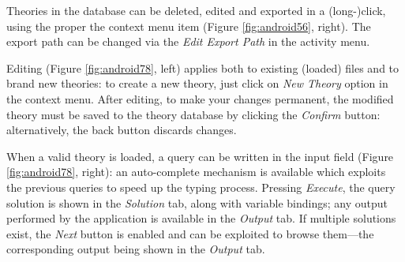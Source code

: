 Theories in the database can be deleted, edited and exported in a (long-)click, using the proper the context menu item (Figure \ref{fig:android56}, right). The export path can be changed via the \textit{Edit Export Path} in the activity menu.

Editing (Figure \ref{fig:android78}, left) applies both to existing (loaded) files and to brand new theories: to create a new theory, just click on \textit{New Theory} option in the context menu.
%
After editing, to make your changes permanent, the modified theory must be saved to the theory database by clicking the \textit{Confirm} button: alternatively, the back button discards changes.

When a valid theory is loaded, a query can be written in the input field (Figure \ref{fig:android78}, right): an auto-complete mechanism is available which exploits the previous queries to speed up the typing process.
%
Pressing \textit{Execute}, the query solution is shown in the \textit{Solution} tab, along with variable bindings; any output performed by the application is available in the \textit{Output} tab. If multiple solutions exist, the \textit{Next} button is enabled and can be exploited to browse them---the corresponding output being shown in the \textit{Output} tab.
